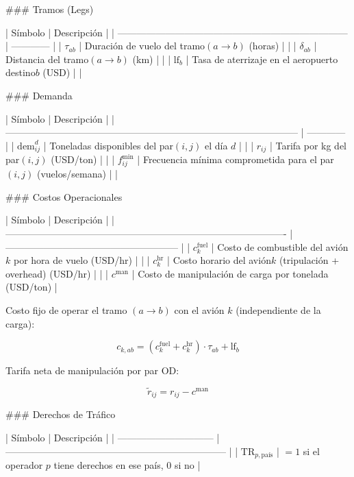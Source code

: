 ### Tramos (Legs)

| Símbolo                                                                 | Descripción |
| ------------------------------------------------------------------------ | ------------ |
| $\tau_{ab}$   | Duración de vuelo del tramo$(a \to b)$ (horas)      |              |
| $\delta_{ab}$ | Distancia del tramo$(a \to b)$ (km)                  |              |
| $\text{lf}_b$ | Tasa de aterrizaje en el aeropuerto destino$b$ (USD) |              |

### Demanda

| Símbolo                                                                                     | Descripción |
| -------------------------------------------------------------------------------------------- | ------------ |
| $\text{dem}_{ij}^d$ | Toneladas disponibles del par$(i,j)$ el día $d$                 |              |
| $r_{ij}$            | Tarifa por kg del par$(i,j)$ (USD/ton)                             |              |
| $f_{ij}^{\min}$     | Frecuencia mínima comprometida para el par$(i,j)$ (vuelos/semana) |              |

### Costos Operacionales

| Símbolo                                                                                 | Descripción                                           |
| ---------------------------------------------------------------------------------------- | ------------------------------------------------------ |
| $c_k^{\text{fuel}}$ | Costo de combustible del avión$k$ por hora de vuelo (USD/hr)  |                                                        |
| $c_k^{\text{hr}}$   | Costo horario del avión$k$ (tripulación + overhead) (USD/hr) |                                                        |
| $c^{\text{man}}$                                                                       | Costo de manipulación de carga por tonelada (USD/ton) |

Costo fijo de operar el tramo $(a \to b)$ con el avión $k$ (independiente de la carga):

$$
c_{k,ab} = (c_k^{\text{fuel}} + c_k^{\text{hr}}) \cdot \tau_{ab} + \text{lf}_b
$$

Tarifa neta de manipulación por par OD:

$$
\tilde{r}_{ij} = r_{ij} - c^{\text{man}}
$$

### Derechos de Tráfico

| Símbolo                       | Descripción                                                          |
| ------------------------------ | --------------------------------------------------------------------- |
| $\text{TR}_{p,\text{país}}$ | $= 1$ si el operador $p$ tiene derechos en ese país, $0$ si no |

